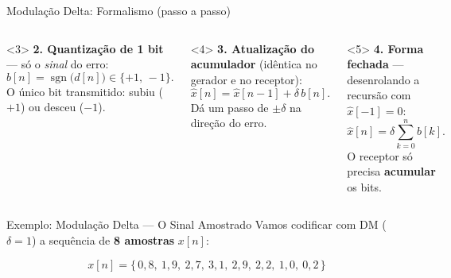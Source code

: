 \begin{frame}{Modulação Delta: Formalismo (passo a passo)}
\begin{columns}[c]
    \begin{onlyenv}<3>
      \textbf{2. Quantização de 1 bit} — só o \emph{sinal} do erro:
      \[ b[n] = \operatorname{sgn}\!\big(d[n]\big) \in \{+1,\,-1\}. \]
      O único bit transmitido: subiu ($+1$) ou desceu ($-1$).
    \end{onlyenv}

    \begin{onlyenv}<4>
      \textbf{3. Atualização do acumulador} (idêntica no gerador e no receptor):
      \[ \hat{x}[n] = \hat{x}[n-1] + \delta\,b[n]. \]
      Dá um passo de $\pm\delta$ na direção do erro.
    \end{onlyenv}

    \begin{onlyenv}<5>
      \textbf{4. Forma fechada} — desenrolando a recursão com $\hat{x}[-1]=0$:
      \[ \hat{x}[n] = \delta\sum_{k=0}^{n} b[k]. \]
      O receptor só precisa \textbf{acumular} os bits.
    \end{onlyenv}
  \end{columns}
\end{frame}


\begin{frame}{Exemplo: Modulação Delta — O Sinal Amostrado}
  Vamos codificar com DM ($\delta = 1$) a sequência de \textbf{8 amostras}
  $x[n]$:

  \vspace{0.05cm}
  \begin{center}
  \end{center}

  \[
    x[n] = \{\,0{,}8,\ 1{,}9,\ 2{,}7,\ 3{,}1,\ 2{,}9,\ 2{,}2,\ 1{,}0,\ 0{,}2\,\}
  \]
\end{frame}


